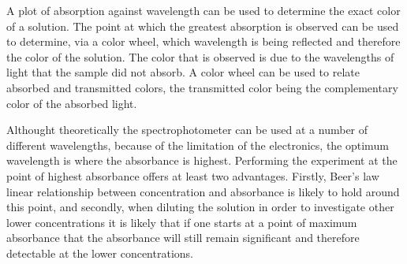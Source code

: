 \documentclass[../chem.tex]{subfiles}
\begin{document}
A plot of absorption against wavelength can be used to determine the exact color of a solution. The point at which the greatest absorption is observed can be used to determine,
via a color wheel, which wavelength is being reflected and therefore the color of the solution. The color that is observed is due to the wavelengths of light 
that the sample did not absorb. A color wheel can be used to relate absorbed and transmitted colors, the transmitted color being the 
complementary color of the absorbed light.

Althought theoretically the spectrophotometer can be used at a number of different wavelengths, because of the limitation of the electronics, 
the optimum wavelength is where the absorbance is highest. Performing the experiment at the point of highest absorbance offers at least two advantages.
Firstly, Beer's law linear relationship between concentration and absorbance is likely to hold around this point, and secondly, when diluting 
the solution in order to investigate other lower concentrations it is likely that if one starts at a point of maximum absorbance that the 
absorbance will still remain significant and therefore detectable at the lower concentrations.

\pagebreak
\end{document}
